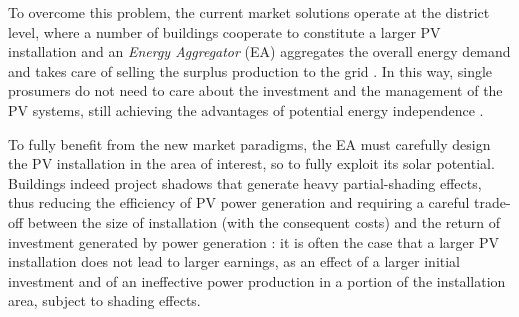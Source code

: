 To overcome this problem, the current market solutions operate at the district level, where a number of buildings cooperate to constitute a larger PV installation and an \emph{Energy Aggregator} (EA) aggregates the overall energy demand and takes care of selling the surplus production to the grid \cite{lu2020fundamentals}. In this way, single prosumers do not need to care about the investment and the management of the PV systems, still achieving the advantages of potential energy independence \cite{mizzimi_2020}.

To fully benefit from the new market paradigms, the EA must carefully design the PV installation in the area of interest, so to fully exploit its solar potential. Buildings indeed project shadows that generate heavy partial-shading effects, thus reducing the efficiency of PV power generation and requiring a careful trade-off between the size of installation (with the consequent costs) and the return of investment generated by power generation \cite{ZHU2019831}: it is often the case that a larger PV installation does not lead to larger earnings, as an effect of a larger initial investment and of an ineffective power production in a portion of the installation area, subject to shading effects.

